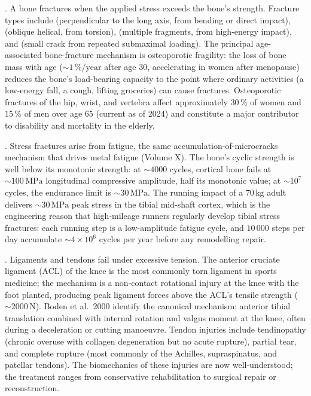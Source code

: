 . A bone fractures when the applied stress
exceeds the bone's strength. Fracture types include
 (perpendicular to the long axis, from bending
or direct impact),  (oblique helical, from torsion),
 (multiple fragments, from high-energy impact),
and  (small crack from repeated submaximal
loading). The principal age-associated bone-fracture mechanism is
osteoporotic fragility: the loss of bone mass with age
($\sim 1\,\%/\text{year}$ after age 30, accelerating in women after
menopause) reduces the bone's load-bearing capacity to the point
where ordinary activities (a low-energy fall, a cough, lifting
groceries) can cause fractures. Osteoporotic fractures of the hip,
wrist, and vertebra affect approximately $30\,\%$ of women and
$15\,\%$ of men over age 65 (current as of 2024) and constitute a
major contributor to disability and mortality in the elderly.

. Stress fractures arise from
fatigue, the same accumulation-of-microcracks mechanism that drives
metal fatigue (Volume X). The bone's cyclic strength is well below
its monotonic strength: at $\sim 4000$ cycles, cortical bone fails at
$\sim 100\,\text{MPa}$ longitudinal compressive amplitude, half its
monotonic value; at $\sim 10^7$ cycles, the endurance limit is
$\sim 30\,\text{MPa}$. The running impact of a $70\,\text{kg}$
adult delivers $\sim 30\,\text{MPa}$ peak stress in the tibial
mid-shaft cortex, which is the engineering reason that high-mileage
runners regularly develop tibial stress fractures: each running step
is a low-amplitude fatigue cycle, and $10\,000$ steps per day
accumulate $\sim 4 \times 10^6$ cycles per year before any
remodelling repair.

. Ligaments and tendons fail
under excessive tension. The anterior cruciate ligament (ACL) of the
knee is the most commonly torn ligament in sports medicine; the
mechanism is a non-contact rotational injury at the knee with the
foot planted, producing peak ligament forces above the ACL's tensile
strength ($\sim 2000\,\text{N}$). Boden et al.\ 2000
\cite[p.~575]{paper:v6c06-tabin-acl-1996} identify the canonical
mechanism: anterior tibial translation combined with internal
rotation and valgus moment at the knee, often during a deceleration
or cutting manoeuvre. Tendon injuries include tendinopathy (chronic
overuse with collagen degeneration but no acute rupture), partial
tear, and complete rupture (most commonly of the Achilles,
supraspinatus, and patellar tendons). The biomechanics of these
injuries are now well-understood; the treatment ranges from
conservative rehabilitation to surgical repair or reconstruction.

